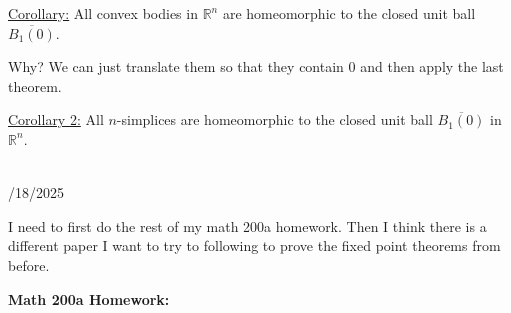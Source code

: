 \documentclass{book}
\newcommand{\hTwo}{%
\color{Black}%
   \fontsize{13}{15}\selectfont%
}
\newcommand{\exThreeP}{%
   \color{RedViolet}%
   \fontsize{12}{14}\selectfont%
}
\newenvironment{myIndent}{%
   \begin{adjustwidth}{2.5em}{0em}%
}{%
   \end{adjustwidth}%
}
\newcommand{\blect}[1]{{\color{MidnightBlue}\textbf{#1}}}
\newcommand{\mySepTwo}[1][.]{%
   {\noindent\color{#1}{\rule{6.5in}{0.5mm}}}\\%
}
\newcommand{\retTwo}{\hfill\bigbreak}
\newcommand{\dispDate}[1]{{
   \color{Black}%
   \fontsize{20}{18}\selectfont%
   #1\retTwo
}}
\begin{document}
\ul{Corollary:} All convex bodies in $\mathbb{R}^n$ are homeomorphic to the closed unit ball $\overline{B_1(0)}$.
\begin{myIndent}\exThreeP
	Why? We can just translate them so that they contain $0$ and then apply the last theorem.\retTwo
\end{myIndent}

\ul{Corollary 2:} All $n$-simplices are homeomorphic to the closed unit ball $\overline{B_1(0)}$ in $\mathbb{R}^n$.\retTwo

\hTwo\mySepTwo 

\dispDate{10/18/2025}

I need to first do the rest of my math 200a homework. Then I think there is a different paper I want to try to following to prove the fixed point theorems from before.\retTwo

\blect{Math 200a Homework:}\retTwo
\end{document}
